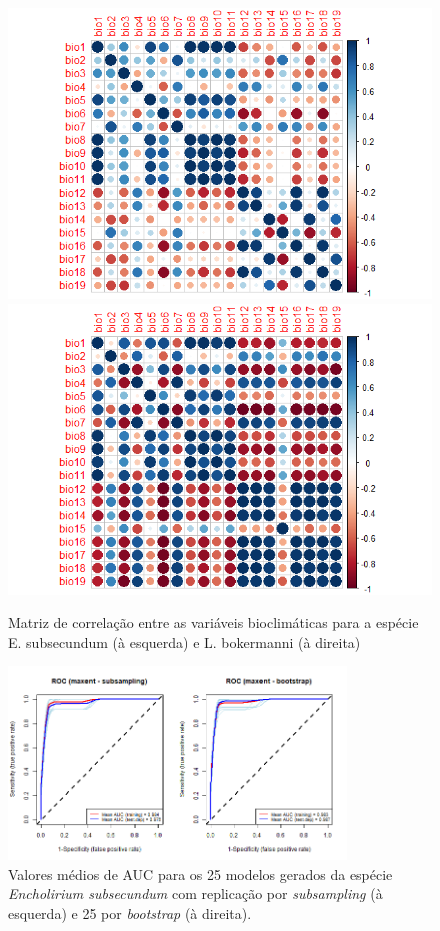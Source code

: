 \documentclass[
  11pt,
]{article}
\begin{document}
\begin{figure}

{\centering \includegraphics[width=0.49\linewidth]{../Dados/Resultados_VIF/E_subsecundum/Corr_plot_19_biovars} \includegraphics[width=0.49\linewidth]{../Dados/Resultados_VIF/L_bokermanni/Corr_plot_19_biovars} 

}

\caption{Matriz de correlação entre as variáveis bioclimáticas para a espécie E. subsecundum (à esquerda) e L. bokermanni (à direita)}\label{fig:VIF_subs}
\end{figure}

\begin{figure}
\centering
\includegraphics[width=0.8\textwidth,height=\textheight]{AUC_subsecundum.png}
\caption{Valores médios de AUC para os 25 modelos gerados da espécie
\emph{Encholirium subsecundum} com replicação por \emph{subsampling} (à
esquerda) e 25 por \emph{bootstrap} (à direita).}
\end{figure}
\end{document}
